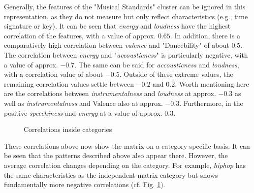 Generally, the features of the "Musical Standards" cluster can be ignored in this representation,
as they do not measure but only reflect characteristics (e.g., time signature or key).
It can be seen that \emph{energy} and \emph{loudness} have the highest correlation of the features,
with a value of approx. \(0.65\).  
In addition, there is a comparatively high correlation between \emph{valence} and "Dancebility" of
about \(0.5\). 
The correlation between \emph{energy} and "\emph{accousticness}" is particularly negative, with a value of approx. \(-0.7\).
The same can be said for \emph{accousticness} and \emph{loudness}, with a correlation value of about \(-0.5\).
Outside of these extreme values, the remaining correlation values settle between \(-0.2\) and \(0.2\).
Worth mentioning here are the correlations between \emph{instrumentalness} and \emph{loudness} at
approx. \(-0.3\) as well as \emph{instrumentalness} and Valence also at approx. \(-0.3\). Furthermore,
in the positive \emph{speechiness} and \emph{energy} at a value of approx. \(0.3\).

\begin{figure}[H]
    \centering
    \qquad
    \qquad
    \caption{Correlations inside categories}%
    \label{fig:du_cm_categorie_dependent}%
\end{figure}

These correlations above now show the matrix on a category-specific basis.
It can be seen that the patterns described above also appear there.
However, the average correlation changes depending on the category.
For example, \emph{\emph{hiphop}} has the same characteristics as the independent matrix category but shows
fundamentally more negative correlations (cf. Fig. \ref{fig:du_cm_categorie_dependent}).

